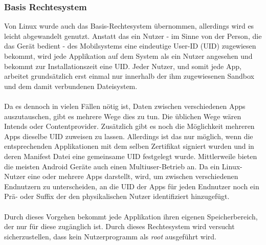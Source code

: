 	\subsubsection{Basis Rechtesystem}\label{sec:BasisRechteSystem}
	Von Linux wurde auch das Basis-Rechtesystem übernommen, allerdings wird es leicht abgewandelt genutzt. Anstatt das ein Nutzer - im Sinne von der Person, die das Gerät bedient - des Mobilsystems eine eindeutige User-ID (UID) zugewiesen bekommt, wird jede Applikation auf dem System als ein Nutzer angesehen und bekommt zur Installationszeit eine UID. Jeder Nutzer, und somit jede App, arbeitet grundsätzlich erst einmal nur innerhalb der ihm zugewiesenen Sandbox und dem damit verbundenen Dateisystem.\\\\
	Da es dennoch in vielen Fällen nötig ist, Daten zwischen verschiedenen Apps auszutauschen, gibt es mehrere Wege dies zu tun. Die üblichen Wege wären Intends oder Contentprovider. Zusätzlich gibt es noch die Möglichkeit mehreren Apps dieselbe UID zuweisen zu lassen. Allerdings ist das nur möglich, wenn die entsprechenden Applikationen mit dem selben Zertifikat signiert wurden und in deren Manifest Datei eine gemeinsame UID festgelegt wurde.
	Mittlerweile bieten die meisten Android Geräte auch einen Multiuser-Betrieb an. Da ein Linux-Nutzer eine oder mehrere Apps darstellt, wird, um zwischen verschiedenen Endnutzern zu unterscheiden, an die UID der Apps für jeden Endnutzer noch ein Prä- oder Suffix der den physikalischen Nutzer identifiziert hinzugefügt.\\\\
	Durch dieses Vorgehen bekommt jede Applikation ihren eigenen Speicherbereich, der nur für diese zugänglich ist. Durch dieses Rechtesystem wird versucht sicherzustellen, dass kein Nutzerprogramm als \textit{root} ausgeführt wird\cite[Kapitel Android's Security Model  - Application Sandboxing]{Drake2014}.
	
